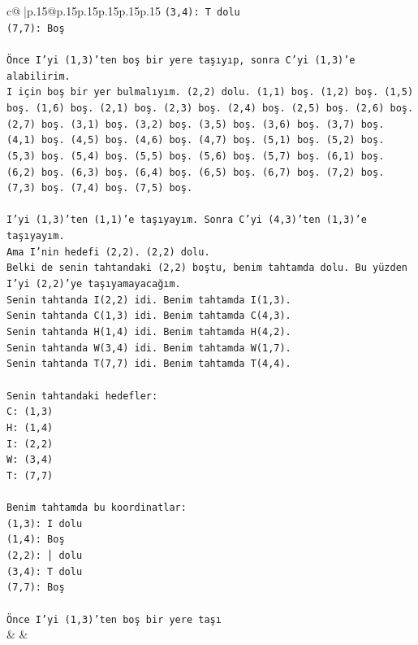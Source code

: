 \documentclass{article}
\begin{document}
{\begin{supertabular}{c@{$\;$}|p{.15\linewidth}@{}p{.15\linewidth}p{.15\linewidth}p{.15\linewidth}p{.15\linewidth}p{.15\linewidth}}
{{{\texttt{(3,4): T dolu} \\
\texttt{(7,7): Boş} \\
\\ 
\texttt{Önce I'yi (1,3)'ten boş bir yere taşıyıp, sonra C'yi (1,3)'e alabilirim.} \\
\texttt{I için boş bir yer bulmalıyım. (2,2) dolu. (1,1) boş. (1,2) boş. (1,5) boş. (1,6) boş. (2,1) boş. (2,3) boş. (2,4) boş. (2,5) boş. (2,6) boş. (2,7) boş. (3,1) boş. (3,2) boş. (3,5) boş. (3,6) boş. (3,7) boş. (4,1) boş. (4,5) boş. (4,6) boş. (4,7) boş. (5,1) boş. (5,2) boş. (5,3) boş. (5,4) boş. (5,5) boş. (5,6) boş. (5,7) boş. (6,1) boş. (6,2) boş. (6,3) boş. (6,4) boş. (6,5) boş. (6,7) boş. (7,2) boş. (7,3) boş. (7,4) boş. (7,5) boş.} \\
\\ 
\texttt{I'yi (1,3)'ten (1,1)'e taşıyayım. Sonra C'yi (4,3)'ten (1,3)'e taşıyayım.} \\
\texttt{Ama I'nin hedefi (2,2). (2,2) dolu.} \\
\texttt{Belki de senin tahtandaki (2,2) boştu, benim tahtamda dolu. Bu yüzden I'yi (2,2)'ye taşıyamayacağım.} \\
\texttt{Senin tahtanda I(2,2) idi. Benim tahtamda I(1,3).} \\
\texttt{Senin tahtanda C(1,3) idi. Benim tahtamda C(4,3).} \\
\texttt{Senin tahtanda H(1,4) idi. Benim tahtamda H(4,2).} \\
\texttt{Senin tahtanda W(3,4) idi. Benim tahtamda W(1,7).} \\
\texttt{Senin tahtanda T(7,7) idi. Benim tahtamda T(4,4).} \\
\\ 
\texttt{Senin tahtandaki hedefler:} \\
\texttt{C: (1,3)} \\
\texttt{H: (1,4)} \\
\texttt{I: (2,2)} \\
\texttt{W: (3,4)} \\
\texttt{T: (7,7)} \\
\\ 
\texttt{Benim tahtamda bu koordinatlar:} \\
\texttt{(1,3): I dolu} \\
\texttt{(1,4): Boş} \\
\texttt{(2,2): │ dolu} \\
\texttt{(3,4): T dolu} \\
\texttt{(7,7): Boş} \\
\\ 
\texttt{Önce I'yi (1,3)'ten boş bir yere taşı} \\
            }
        }
    }
    & & \\ \\


\end{supertabular}}
\end{document}
